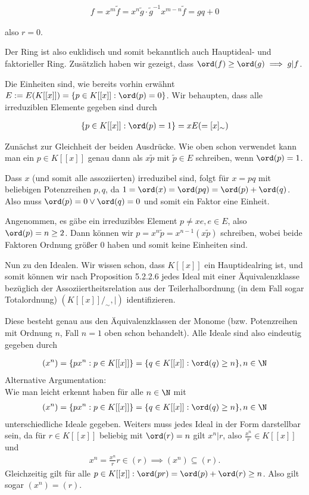 \begin{solution}
\begin{align*}
  f = x^m \tilde{f} = x^n\tilde{g} \cdot \tilde{g}^{-1}x^{m-n}\tilde{f} = gq + 0
\end{align*}

also $r = 0$.

Der Ring ist also euklidisch und somit bekanntlich auch Hauptideal- und faktorieller Ring.
Zusätzlich haben wir gezeigt, dass $\ord(f) \geq \ord(g) \implies g | f$.

Die Einheiten sind, wie bereits vorhin erwähnt $E := E(K[[x]]) = \{p \in K[[x]]: \ord(p) = 0\}$. Wir behaupten, dass alle irreduziblen Elemente gegeben sind durch

\begin{align*}
  \{p \in K[[x]]: \ord(p) = 1\} = xE ( = [x]_{\sim})
\end{align*}

Zunächst zur Gleichheit der beiden Ausdrücke. Wie oben schon verwendet kann man ein $p \in K[[x]]$ genau dann als $x\tilde{p}$ mit $\tilde{p} \in E$ schreiben, wenn $\ord(p) = 1$.

Dass $x$ (und somit alle assoziierten) irreduzibel sind, folgt für $x = pq$ mit beliebigen Potenzreihen $p,q$, da $1 = \ord(x) = \ord(pq) = \ord(p) + \ord(q)$. Also muss $\ord(p) = 0 \lor \ord(q) = 0$ und somit ein Faktor eine Einheit.

Angenommen, es gäbe ein irreduzibles Element $p \neq xe, e \in E$, also $\ord(p) = n \geq 2$. Dann können wir $p = x^n\tilde{p} = x^{n-1} (x\tilde{p})$ schreiben, wobei beide Faktoren Ordnung größer 0 haben und somit keine Einheiten sind.

Nun zu den Idealen. Wir wissen schon, dass $K[[x]]$ ein Hauptidealring ist, und somit können wir nach Proposition 5.2.2.6 jedes Ideal mit einer Äquivalenzklasse
bezüglich der Assoziiertheitsrelation aus der Teilerhalbordnung (in dem Fall sogar Totalordnung) $(K[[x]]/_{\sim},|)$ identifizieren.

Diese besteht genau aus den Äquivalenzklassen der Monome (bzw. Potenzreihen mit Ordnung $n$, Fall $n=1$ oben schon behandelt). Alle Ideale sind also eindeutig gegeben durch

\begin{align*}
  (x^n) = \{px^n: p \in K[[x]]\} = \{q \in K[[x]]: \ord(q) \geq n\}, n \in \N
\end{align*}
Alternative Argumentation: \\
Wie man leicht erkennt haben für alle $n \in \N$ mit
\begin{align*}
  (x^n) = \{px^n: p \in K[[x]]\} = \{q \in K[[x]]: \ord(q) \geq n\}, n \in \N
\end{align*}
unterschiedliche Ideale gegeben. Weiters muss jedes Ideal in der Form darstellbar sein,
da für $r \in K[[x]]$ beliebig mit $\ord(r) = n$ gilt $x^n | r$, also $\frac{x^n}{r} \in K[[x]]$ und
\begin{align*}
  x^n = \frac{x^n}{r}r \in (r) \implies (x^n) \subseteq (r).
\end{align*}
Gleichzeitig gilt für alle $p \in K[[x]]: \ord(pr) = \ord(p) + \ord(r) \geq n$.
Also gilt sogar $(x^n) = (r)$.
\end{solution}

